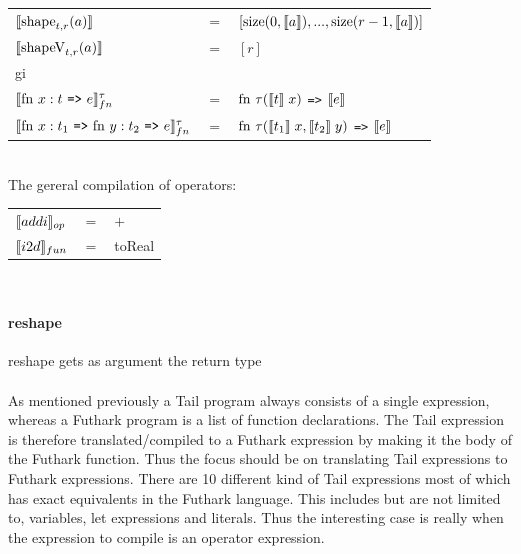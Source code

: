\documentclass[11pt]{article}
\begin{document}
\begin{tabular}{l c l}
$\llbracket \text{shape}_{t,r}(a) \rrbracket$ & $=$ & $[\text{size}(0,\llbracket a \rrbracket),...,\text{size}(r-1,\llbracket a \rrbracket)]$\\

$\llbracket \text{shapeV}_{t,r}(a) \rrbracket$ & $=$ & $[r]$\\
gi
\\
%
%
$\evals{ \text{fn } x:t $ {\tt =>} $ e}^{\tau}_{fn} $ & $=$ & $ \text{fn } \tau (\llbracket t \rrbracket\; x) $ {\tt =>} $ \llbracket e \rrbracket$\\
$\evals{ \text{fn } x:t_1$ {\tt =>} $\text{fn } y:t_2 $ {\tt =>} $ e}^{\tau}_{fn} $ & $=$ & $ \text{fn } \tau (\llbracket t_1 \rrbracket\; x, \llbracket t_2 \rrbracket \; y) $ {\tt =>} $ \llbracket e \rrbracket$\\
\end{tabular}\\

The gereral compilation of operators:\\

\begin{tabular}{l c l}
$\llbracket addi \rrbracket_{op}$ & $=$ & $+$\\
$\llbracket i2d \rrbracket_{fun}$ & $=$ & toReal\\ 
\end{tabular}\\

\paragraph{reshape}
reshape gets as argument the return type\\\\

As mentioned previously a Tail program always consists of a single expression,
whereas a Futhark program is a list of function declarations.
The Tail expression is therefore translated/compiled to a Futhark expression by making it the body of the Futhark function\cite{ElsmanDybdal:Array:2014}\cite{TroelsHenriksen}. 
Thus the focus should be on translating Tail expressions to Futhark expressions. 
There are 10 different kind of Tail expressions most of which has exact equivalents in the Futhark language.
This includes but are not limited to, variables, let expressions and literals.
Thus the interesting case is really when the expression to compile is an operator expression. \\
\end{document}
